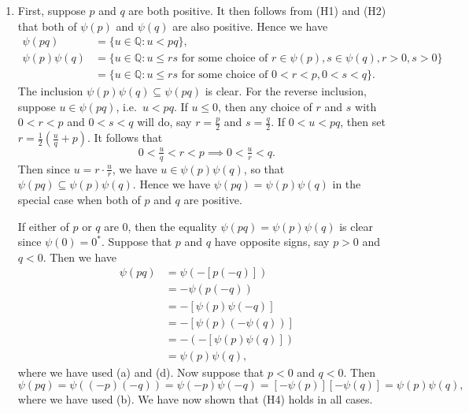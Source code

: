 \documentclass[12pt]{article}
\newcommand{\newp}{\vspace{5mm}}
\theoremstyle{definition}
\begin{document}
\begin{enumerate}[label = (H\arabic*), start = 2]
    \item First, suppose \( p \) and \( q \) are both positive. It then follows from (H1) and (H2) that both of \( \psi(p) \) and \( \psi(q) \) are also positive. Hence we have
    \begin{align*}
        \psi(pq) &= \{ u \in \mathbb{Q} : u < pq \}, \\
        \psi(p) \psi(q) &= \{ u \in \mathbb{Q} : u \leq rs \text{ for some choice of } r \in \psi(p), s \in \psi(q), r > 0, s > 0 \} \\
        &= \{ u \in \mathbb{Q} : u \leq rs \text{ for some choice of } 0 < r < p, 0 < s < q \}.
    \end{align*}
    The inclusion \( \psi(p) \psi(q) \subseteq \psi(pq) \) is clear. For the reverse inclusion, suppose \( u \in \psi(pq) \), i.e.\ \( u < pq \). If \( u \leq 0 \), then any choice of \( r \) and \( s \) with \( 0 < r < p \) and \( 0 < s < q \) will do, say \( r = \tfrac{p}{2} \) and \( s = \tfrac{q}{2} \). If \( 0 < u < pq \), then set \( r = \tfrac{1}{2}\left(\tfrac{u}{q} + p\right) \). It follows that
    \[
        0 < \tfrac{u}{q} < r < p \implies 0 < \tfrac{u}{r} < q.
    \]
    Then since \( u = r \cdot \tfrac{u}{r} \), we have \( u \in \psi(p) \psi(q) \), so that \( \psi(pq) \subseteq \psi(p) \psi(q) \). Hence we have \( \psi(pq) = \psi(p) \psi(q) \) in the special case when both of \( p \) and \( q \) are positive.

    \newp

    If either of \( p \) or \( q \) are 0, then the equality \( \psi(pq) = \psi(p) \psi(q) \) is clear since \( \psi(0) = 0^* \). Suppose that \( p \) and \( q \)  have opposite signs, say \( p > 0 \) and \( q < 0 \). Then we have
    \begin{align*}
        \psi(pq) &= \psi(-[p(-q)]) \\
        &= -\psi(p(-q)) \\
        &= -[\psi(p) \psi(-q)] \\
        &= -[\psi(p) (-\psi(q))] \\
        &= -(-[\psi(p) \psi(q)]) \\
        &= \psi(p) \psi(q),
    \end{align*}
    where we have used  (a) and  (d). Now suppose that \( p < 0 \) and \( q < 0 \). Then
    \[
        \psi(pq) = \psi((-p)(-q)) = \psi(-p) \psi(-q) = [-\psi(p)] [-\psi(q)] = \psi(p) \psi(q),
    \]
    where we have used  (b). We have now shown that (H4) holds in all cases.
\end{enumerate}
\end{document}
